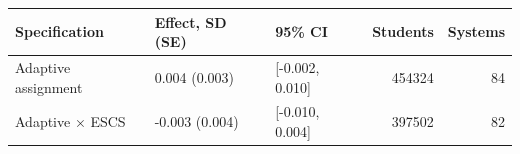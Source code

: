 \begin{tabular}{lllrr}
\toprule
Specification & Effect, SD (SE) & 95\% CI & Students & Systems \\
\midrule
Adaptive assignment & 0.004 (0.003) & [-0.002, 0.010] & 454324 & 84 \\
Adaptive × ESCS & -0.003 (0.004) & [-0.010, 0.004] & 397502 & 82 \\
\bottomrule
\end{tabular}

